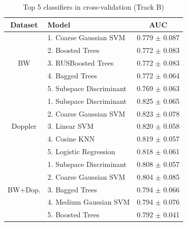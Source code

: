 \documentclass[12pt,a4paper]{article}
\begin{document}
\begin{table}[h]
    \centering
    \begin{minipage}{0.48\textwidth}
        \centering
        \caption{Top 5 classifiers in cross-validation (Track A, exemplified for K=20)}
        \label{tab:top5-cv-trilha-a}
        \scriptsize
        \setlength{\tabcolsep}{3pt}
        \begin{tabular}{clc}
            \toprule
            \textbf{Dataset} & \textbf{Model} & \textbf{AUC} \\
            \midrule
            \multirow{5}{*}{BW}
                & 1. Coarse Gaussian SVM    & 0.779 $\pm$ 0.087 \\
                & 2. Boosted Trees          & 0.772 $\pm$ 0.083 \\
                & 3. RUSBoosted Trees       & 0.772 $\pm$ 0.083 \\
                & 4. Bagged Trees           & 0.772 $\pm$ 0.064 \\
                & 5. Subspace Discriminant  & 0.769 $\pm$ 0.063 \\
            \midrule
            \multirow{5}{*}{Doppler}
                & 1. Subspace Discriminant  & 0.825 $\pm$ 0.065 \\
                & 2. Coarse Gaussian SVM    & 0.823 $\pm$ 0.078 \\
                & 3. Linear SVM             & 0.820 $\pm$ 0.058 \\
                & 4. Cosine KNN             & 0.819 $\pm$ 0.057 \\
                & 5. Logistic Regression    & 0.818 $\pm$ 0.061 \\
            \midrule
            \multirow{5}{*}{BW+Dop.}
                & 1. Subspace Discriminant  & 0.808 $\pm$ 0.057 \\
                & 2. Coarse Gaussian SVM    & 0.804 $\pm$ 0.085 \\
                & 3. Bagged Trees           & 0.794 $\pm$ 0.066 \\
                & 4. Medium Gaussian SVM    & 0.794 $\pm$ 0.076 \\
                & 5. Boosted Trees          & 0.792 $\pm$ 0.041 \\
            \bottomrule
        \end{tabular}
    \end{minipage}
    \hfill
    \begin{minipage}{0.48\textwidth}
        \centering
        \caption{Top 5 classifiers in cross-validation (Track B)}

\end{minipage}
\end{table}
\end{document}
